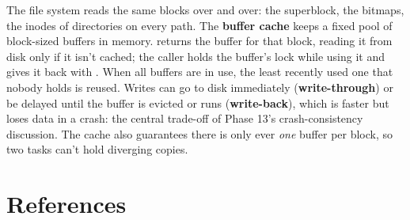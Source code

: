\documentclass[11pt,a4paper]{article}
\begin{document}
The file system reads the same blocks over and over: the superblock, the bitmaps, the inodes of directories on every
path. The \textbf{buffer cache} keeps a fixed pool of block-sized buffers in memory.  returns
the buffer for that block, reading it from disk only if it isn't cached; the caller holds the buffer's lock while
using it and gives it back with . When all buffers are in use, the least recently used one that nobody
holds is reused. Writes can go to disk immediately (\textbf{write-through}) or be delayed until the buffer is evicted
or  runs (\textbf{write-back}), which is faster but loses data in a crash: the central trade-off of Phase
13's crash-consistency discussion. The cache also guarantees there is only ever \emph{one} buffer per block, so two
tasks can't hold diverging copies.

\section{References}
\end{document}
